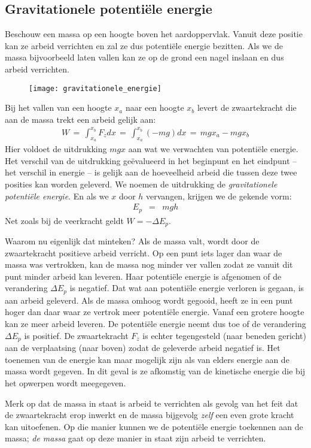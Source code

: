 \documentclass{ximera}
\begin{document}
	\author{Bart Lambregs}
    \xmsource


	\subsection{Gravitationele potenti\"ele energie}\label{gravitationele potentiele energie}

	Beschouw een massa op een hoogte boven het aardoppervlak. Vanuit deze positie kan ze arbeid verrichten en zal ze dus potenti\"ele energie bezitten. Als we de massa bijvoorbeeld laten vallen kan ze op de grond een nagel inslaan en dus arbeid verrichten.
	\begin{figure}[h]
	\begin{center}
	\texttt{[image: gravitationele\_energie]}
	\end{center}
	\end{figure}
	Bij het vallen van een hoogte $x_a$ naar een hoogte $x_b$ levert de zwaartekracht die aan de massa trekt een arbeid gelijk aan:
	\begin{eqnarray*}
	W\,=\,\int_{x_a}^{x_b}F_zdx\,=\,\int_{x_a}^{x_b}(-mg)dx\,=\,mgx_a-mgx_b
	\end{eqnarray*}
	Hier voldoet de uitdrukking $mgx$ aan wat we verwachten van potenti\"ele ener\-gie. Het verschil van de uitdrukking ge\"evalueerd in het beginpunt en het eindpunt -- het verschil in energie -- is gelijk aan de hoeveelheid arbeid die tussen deze twee posities kan worden geleverd. We noemen de uitdrukking de \textit{gravitationele potenti\"ele energie}. En als we $x$ door $h$ vervangen, krijgen we de gekende vorm:
	\begin{eqnarray}
	E_p&=&mgh\label{Ep=mgh}
	\end{eqnarray}
	Net zoals bij de veerkracht geldt $W=-\Delta E_p$. 
	
	Waarom nu eigenlijk dat minteken? Als de massa valt, wordt door de zwaartekracht positieve arbeid verricht. Op een punt iets lager dan waar de massa was vertrokken, kan de massa nog minder ver vallen zodat ze vanuit dit punt minder arbeid kan leveren. Haar potenti\"ele energie is afgenomen of de verandering $\Delta E_p$ is negatief. Dat wat aan potenti\"ele energie verloren is gegaan, is aan arbeid geleverd. Als de massa omhoog wordt gegooid, heeft ze in een punt hoger dan daar waar ze vertrok meer potenti\"ele energie. Vanaf een grotere hoogte kan ze meer arbeid leveren. De potenti\"ele energie neemt dus toe of de verandering $\Delta E_p$ is positief. De zwaartekracht $F_z$ is echter tegengesteld (naar beneden gericht) aan de verplaatsing (naar boven) zodat de geleverde arbeid negatief is. Het toenemen van de energie kan maar mogelijk zijn als van elders energie aan de massa wordt gegeven. In dit geval is ze afkomstig van de kinetische energie die bij het opwerpen wordt meegegeven.
	
	Merk op dat de massa in staat is arbeid te verrichten als gevolg van het feit dat de zwaartekracht erop inwerkt en de massa bijgevolg \textit{zelf} een even grote kracht kan uitoefenen. Op die manier kunnen we de potenti\"ele energie toekennen aan de massa; \textit{de massa} gaat op deze manier in staat zijn arbeid te verrichten.
	
\end{document}

